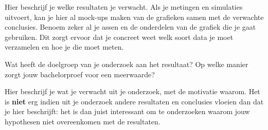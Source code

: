 Hier beschrijf je welke resultaten je verwacht. Als je metingen en simulaties uitvoert, kan je hier al mock-ups maken van de grafieken samen met de verwachte conclusies. Benoem zeker al je assen en de onderdelen van de grafiek die je gaat gebruiken. Dit zorgt ervoor dat je concreet weet welk soort data je moet verzamelen en hoe je die moet meten.

Wat heeft de doelgroep van je onderzoek aan het resultaat? Op welke manier zorgt jouw bachelorproef voor een meerwaarde?

Hier beschrijf je wat je verwacht uit je onderzoek, met de motivatie waarom. Het is \textbf{niet} erg indien uit je onderzoek andere resultaten en conclusies vloeien dan dat je hier beschrijft: het is dan juist interessant om te onderzoeken waarom jouw hypothesen niet overeenkomen met de resultaten.


